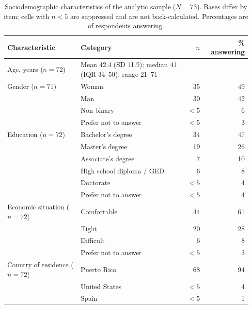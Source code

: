 \documentclass[12pt]{article}
\begin{document}
\begin{table}[htbp]
\centering
\caption{Sociodemographic characteristics of the analytic sample ($N=73$). Bases differ by item; cells with
$n<5$ are suppressed and are not back-calculated. Percentages are of respondents answering.}
\label{tab:demo}
\begin{tabular}{p{3.6cm}p{6.4cm}rr}
\toprule
Characteristic & Category & $n$ & \% answering \\
\midrule
Age, years ($n=72$) & Mean 42.4 (SD 11.9); median 41 (IQR 34--50); range 21--71 & & \\
\addlinespace
Gender ($n=71$)     & Woman & 35 & 49 \\
                    & Man & 30 & 42 \\
                    & Non-binary & $<5$ & 6 \\
                    & Prefer not to answer & $<5$ & 3 \\
\addlinespace
Education ($n=72$)  & Bachelor's degree & 34 & 47 \\
                    & Master's degree & 19 & 26 \\
                    & Associate's degree & 7 & 10 \\
                    & High school diploma / GED & 6 & 8 \\
                    & Doctorate & $<5$ & 4 \\
                    & Prefer not to answer & $<5$ & 4 \\
\addlinespace
Economic situation ($n=72$) & Comfortable & 44 & 61 \\
                    & Tight & 20 & 28 \\
                    & Difficult & 6 & 8 \\
                    & Prefer not to answer & $<5$ & 3 \\
\addlinespace
Country of residence ($n=72$) & Puerto Rico & 68 & 94 \\
                    & United States & $<5$ & 4 \\
                    & Spain & $<5$ & 1 \\
\bottomrule
\end{tabular}
\end{table}
\end{document}
